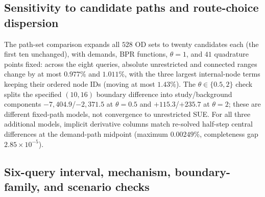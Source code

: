 \subsection{Sensitivity to candidate paths and route-choice dispersion}\label{supp:coverage}
The path-set comparison expands all $528$ OD sets to twenty
candidates each (the first ten unchanged), with demands, BPR
functions, $\theta=1$, and $41$ quadrature points fixed: across the
eight queries, absolute unrestricted and connected ranges change by
at most $0.977\%$ and $1.011\%$, with the three largest
internal-node terms keeping their ordered node IDs (moving at most
$1.43\%$). The $\theta\in\{0.5,2\}$ check splits the specified
$(10,16)$ boundary difference into study/background components
$-7{,}404.9$/$-2{,}371.5$ at $\theta=0.5$ and $+115.3$/$+235.7$ at
$\theta=2$; these are different fixed-path models, not convergence to
unrestricted SUE. For all three additional models, implicit derivative
columns match re-solved half-step central differences at the
demand-path midpoint (maximum $0.00249\%$, completeness gap
$2.85\times10^{-5}$).

\subsection{Six-query interval, mechanism, boundary-family, and
scenario checks}\label{supp:newodaccuracy}


